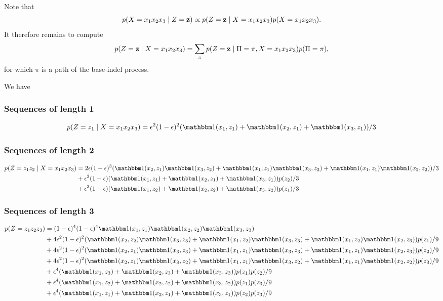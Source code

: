 Note that
\begin{equation*}
  p(X=x_1x_2x_3 \;|\; Z=\mathbf{z}) \propto p(Z=\mathbf{z} \;|\; X=x_1x_2x_3) p(X=x_1x_2x_3).
\end{equation*}
It therefore remains to compute
\begin{equation*}
  p(Z=\mathbf{z} \;|\; X=x_1x_2x_3) = \sum_{\pi}p(Z=\mathbf{z} \;|\; \Pi=\pi, X=x_1x_2x_3) p(\Pi=\pi),
\end{equation*}
for which $\pi$ is a path of the base-indel process.

We have

\subsubsection{Sequences of length 1}

\begin{equation*}
  p(Z=z_1 \gv X=x_1x_2x_3) = \e^2(1-\e)^2(\I(x_1, z_1) + \I(x_2, z_1) + \I(x_3, z_1))/3
\end{equation*}

\subsubsection{Sequences of length 2}

\begin{equation*}
  \begin{split}
    p(Z=z_1z_2 \gv X=x_1x_2x_3)
        &= 2\e(1-\e)^3(\I(x_2, z_1)\I(x_3, z_2) + \I(x_1, z_1)\I(x_3, z_2) + \I(x_1, z_1)\I(x_2, z_2))/3\\
        &+ \e^3(1-\e)(\I(x_1, z_1) + \I(x_2, z_1) + \I(x_3, z_1))p(z_2)/3\\
        &+ \e^3(1-\e)(\I(x_1, z_2) + \I(x_2, z_2) + \I(x_3, z_2))p(z_1)/3
  \end{split}
\end{equation*}

\subsubsection{Sequences of length 3}

\begin{equation*}
  \begin{split}
    p(Z=z_1z_2z_3) &= (1-\e)^4 (1-\e)^4\I(x_1, z_1)\I(x_2, z_2)\I(x_3, z_3)\\
        &+ 4\e^2(1-\e)^2 (\I(x_2, z_2)\I(x_3, z_3) + \I(x_1, z_2)\I(x_3, z_ 3) + \I(x_1, z_2)\I(x_2, z_3)) p(z_1)/9\\
        &+ 4\e^2(1-\e)^2 (\I(x_2, z_1)\I(x_3, z_3) + \I(x_1, z_1)\I(x_3, z_3) + \I(x_1, z_1)\I(x_2, z_3))p(z_2)/9\\
        &+ 4\e^2(1-\e)^2 (\I(x_2, z_1)\I(x_3, z_2) + \I(x_1, z_1)\I(x_3, z_2) + \I(x_1, z_1)\I(x_2, z_2))p(z_3)/9\\
        &+ \e^4 (\I(x_1, z_3) + \I(x_2, z_3) + \I(x_3, z_3))p(z_1)p(z_2)/9\\
        &+ \e^4 (\I(x_1, z_2) + \I(x_2, z_2) + \I(x_3, z_2))p(z_1)p(z_3)/9\\
        &+ \e^4 (\I(x_1, z_1) + \I(x_2, z_1) + \I(x_3, z_1))p(z_2)p(z_3)/9
  \end{split}
\end{equation*}

